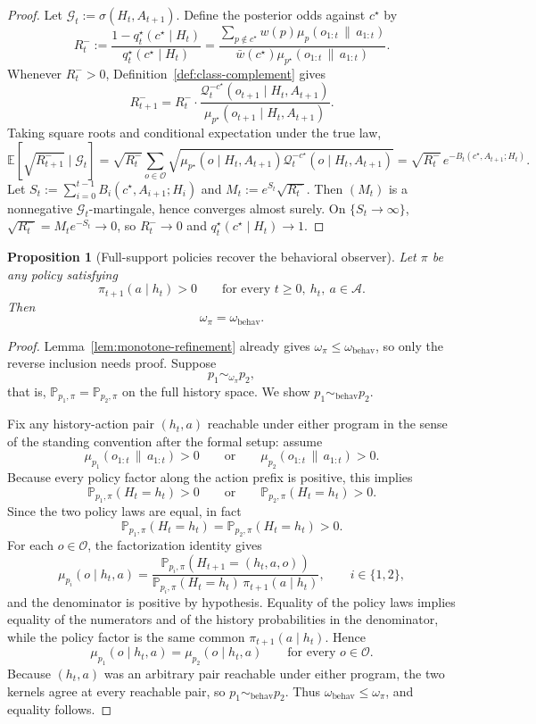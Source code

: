 \documentclass[11pt]{article}
\newtheorem{proposition}[theorem]{Proposition}
\theoremstyle{definition}
\theoremstyle{remark}
\newcommand{\Acal}{\mathcal{A}}
\newcommand{\Ocal}{\mathcal{O}}
\newcommand{\Qcal}{\mathcal{Q}}
\newcommand{\E}{\mathbb{E}}
\newcommand{\Prob}{\mathbb{P}}
\newcommand{\givena}{\,\|\,}
\begin{document}
\begin{proof}
Let $\mathcal{G}_t:=\sigma(H_t,A_{t+1})$. Define the posterior odds against $c^\star$ by
\[
R_t^-:=\frac{1-q_t^\star(c^\star\mid H_t)}{q_t^\star(c^\star\mid H_t)}
=\frac{\sum_{p\notin c^\star}w(p)\mu_p(o_{1:t}\givena a_{1:t})}
      {\bar w(c^\star)\mu_{p^\star}(o_{1:t}\givena a_{1:t})}.
\]
Whenever $R_t^->0$, Definition~\ref{def:class-complement} gives
\[
R_{t+1}^-=R_t^-\cdot\frac{\Qcal_t^{-c^\star}(o_{t+1}\mid H_t,A_{t+1})}{\mu_{p^\star}(o_{t+1}\mid H_t,A_{t+1})}.
\]
Taking square roots and conditional expectation under the true law,
\[
\E\!\left[\sqrt{R_{t+1}^-}\mid\mathcal{G}_t\right]
=
\sqrt{R_t^-}\sum_{o\in\Ocal}\sqrt{\mu_{p^\star}(o\mid H_t,A_{t+1})\Qcal_t^{-c^\star}(o\mid H_t,A_{t+1})}
=
\sqrt{R_t^-}\,e^{-B_t(c^\star,A_{t+1};H_t)}.
\]
Let $S_t:=\sum_{i=0}^{t-1}B_i(c^\star,A_{i+1};H_i)$ and $M_t:=e^{S_t}\sqrt{R_t^-}$. Then $(M_t)$ is a nonnegative $\mathcal{G}_t$-martingale, hence converges almost surely. On $\{S_t\to\infty\}$, $\sqrt{R_t^-}=M_te^{-S_t}\to 0$, so $R_t^-\to 0$ and $q_t^\star(c^\star\mid H_t)\to 1$.
\end{proof}

\begin{proposition}[Full-support policies recover the behavioral observer]
\label{prop:full-support-behavioral}
Let $\pi$ be any policy satisfying
\[
\pi_{t+1}(a\mid h_t)>0
\qquad
\text{for every }t\ge 0,\ h_t,\ a\in\Acal.
\]
Then
\[
\omega_\pi=\omega_{\mathrm{behav}}.
\]
\end{proposition}

\begin{proof}
Lemma~\ref{lem:monotone-refinement} already gives $\omega_\pi\le\omega_{\mathrm{behav}}$, so only the reverse inclusion needs proof. Suppose
\[
p_1\sim_{\omega_\pi}p_2,
\]
that is, $\Prob_{p_1,\pi}=\Prob_{p_2,\pi}$ on the full history space. We show $p_1\sim_{\mathrm{behav}}p_2$.

Fix any history-action pair $(h_t,a)$ reachable under either program in the sense of the standing convention after the formal setup: assume
\[
\mu_{p_1}(o_{1:t}\givena a_{1:t})>0
\qquad\text{or}\qquad
\mu_{p_2}(o_{1:t}\givena a_{1:t})>0.
\]
Because every policy factor along the action prefix is positive, this implies
\[
\Prob_{p_1,\pi}(H_t=h_t)>0
\qquad\text{or}\qquad
\Prob_{p_2,\pi}(H_t=h_t)>0.
\]
Since the two policy laws are equal, in fact
\[
\Prob_{p_1,\pi}(H_t=h_t)=\Prob_{p_2,\pi}(H_t=h_t)>0.
\]
For each $o\in\Ocal$, the factorization identity gives
\[
\mu_{p_i}(o\mid h_t,a)
=
\frac{\Prob_{p_i,\pi}(H_{t+1}=(h_t,a,o))}
{\Prob_{p_i,\pi}(H_t=h_t)\,\pi_{t+1}(a\mid h_t)},
\qquad i\in\{1,2\},
\]
and the denominator is positive by hypothesis. Equality of the policy laws implies equality of the numerators and of the history probabilities in the denominator, while the policy factor is the same common $\pi_{t+1}(a\mid h_t)$. Hence
\[
\mu_{p_1}(o\mid h_t,a)=\mu_{p_2}(o\mid h_t,a)
\qquad\text{for every }o\in\Ocal.
\]
Because $(h_t,a)$ was an arbitrary pair reachable under either program, the two kernels agree at every reachable pair, so $p_1\sim_{\mathrm{behav}}p_2$. Thus $\omega_{\mathrm{behav}}\le\omega_\pi$, and equality follows.
\end{proof}
\end{document}
